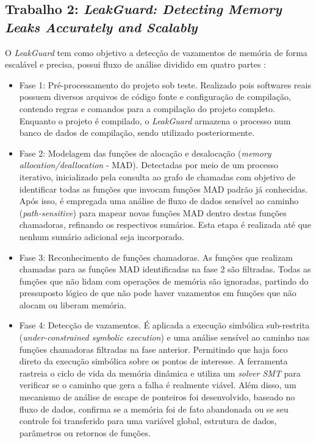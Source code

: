 \documentclass[
    12pt,                %
    openright,           %
    oneside,             %
    a4paper,             %
    english,             %
    brazil               %
]{abntex2}
\begin{document}
\subsection{Trabalho 2: \textit{LeakGuard: Detecting Memory Leaks Accurately and Scalably}}
\label{sub:trabalho_2}

O \textit{LeakGuard} tem como objetivo a detecção de vazamentos de memória de forma escalável e precisa, possui fluxo de análise dividido em quatro partes \cite{LeakGuard2025}:

\begin{itemize}
    \item Fase 1: Pré-processamento do projeto sob teste. Realizado pois softwares reais possuem diversos arquivos de código fonte e configuração de compilação, contendo regras e comandos para a compilação do projeto completo. Enquanto o projeto é compilado, o \textit{LeakGuard} armazena o processo num banco de dados de compilação, sendo utilizado posteriormente.
    \item Fase 2: Modelagem das funções de alocação e desalocação (\textit{memory allocation/deallocation} - MAD). Detectadas por meio de um processo iterativo, inicializado pela consulta ao grafo de chamadas com objetivo de identificar todas as funções que invocam funções MAD padrão já conhecidas. Após isso, é empregada uma análise de fluxo de dados sensível ao caminho (\textit{path-sensitive}) 
    para mapear novas funções MAD dentro destas funções chamadoras, refinando os respectivos sumários. Esta etapa é realizada até que nenhum sumário adicional seja incorporado.
    \item Fase 3: Reconhecimento de funções chamadoras. As funções que realizam chamadas para as funções MAD identificadas na fase 2 são filtradas. Todas as funções que não lidam com operações de memória são ignoradas, partindo do pressuposto lógico de que não pode haver vazamentos em funções que não alocam ou liberam memória.  
    \item Fase 4: Detecção de vazamentos. É aplicada a execução simbólica sub-restrita (\textit{under-constrained symbolic execution}) e uma análise sensível ao caminho nas funções chamadoras filtradas na fase anterior. Permitindo que haja foco direto da execução simbólica sobre os pontos de interesse. 
    A ferramenta rastreia o ciclo de vida da memória dinâmica e utiliza um \textit{solver SMT} para verificar se o caminho que gera a falha é realmente viável. Além disso, um mecanismo de análise de escape de ponteiros foi desenvolvido, baseado no fluxo de dados, confirma se a memória foi de fato abandonada ou se seu controle foi transferido para uma variável global, estrutura de dados, parâmetros ou retornos de funções.
\end{itemize}
\end{document}
